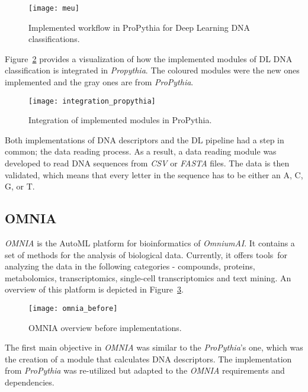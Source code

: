 \begin{figure}[htbp]
    \centering
    \texttt{[image: meu]}
    \caption{Implemented workflow in ProPythia for Deep Learning DNA classifications.}
    \label{fig:meu}
\end{figure}

Figure~\ref{fig:integration_propythia} provides a visualization of how the implemented modules of \gls{DL} \gls{DNA} classification is integrated in \textit{Propythia}. The coloured modules were the new ones implemented and the gray ones are from \textit{ProPythia}.

\begin{figure}[htbp]
    \centering
    \texttt{[image: integration\_propythia]}
    \caption{Integration of implemented modules in ProPythia.}
    \label{fig:integration_propythia}
\end{figure}

Both implementations of \gls{DNA} descriptors and the \gls{DL} pipeline had a step in common; the data reading process. As a result, a data reading module was developed to read \gls{DNA} sequences from \textit{CSV} or \textit{FASTA} files. The data is then validated, which means that every letter in the sequence has to be either an \gls{A}, \gls{C}, \gls{G}, or \gls{T}.

\subsection{OMNIA}

\textit{OMNIA} is the \gls{AutoML} platform for bioinformatics of \textit{OmniumAI}. It contains a set of methods for the analysis of biological data. Currently, it offers tools for analyzing the data in the following categories - compounds, proteins, metabolomics, transcriptomics, single-cell transcriptomics and text mining. An overview of this platform is depicted in Figure~\ref{fig:omnia_before}.

\begin{figure}[htbp]
    \centering
    \texttt{[image: omnia\_before]}
    \caption{OMNIA overview before implementations.}
    \label{fig:omnia_before}
\end{figure}

The first main objective in \textit{OMNIA} was similar to the \textit{ProPythia}'s one, which was the creation of a module that calculates \gls{DNA} descriptors. The implementation from \textit{ProPythia} was re-utilized but adapted to the \textit{OMNIA} requirements and dependencies.

